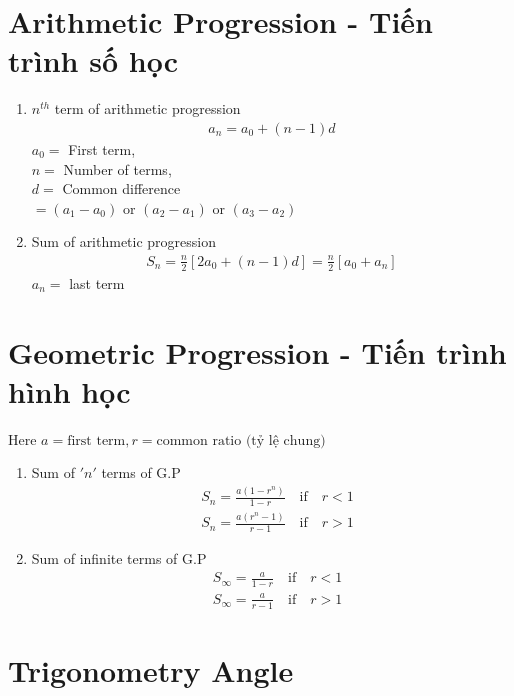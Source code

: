 \documentclass{article}
\begin{document}
\section{Arithmetic Progression - Tiến trình số học}
\begin{enumerate}[label=(\roman*)]
	
	\item $n^{th}$ term of arithmetic progression
	\begin{align*}
		a_n = a_0 + (n - 1)d
	\end{align*}
	$a_0 =$ First term, \\
	$n =$ Number of terms, \\
	$d =$ Common difference \\
	$ = (a_1 - a_0)$ or $(a_2 - a_1)$ or $(a_3 - a_2)$
	
	\item Sum of arithmetic progression
	\begin{align*}
		S_n = \frac{n}{2}[2a_0 + (n-1)d] = \frac{n}{2}[a_0 + a_n]
	\end{align*}
	$a_n =$ last term	
\end{enumerate}

\section{Geometric Progression - Tiến trình hình học}
Here $a = \text{first term}, r = \text{common ratio (tỷ lệ chung)}$
\begin{enumerate}[label=(\roman*)]
    \item Sum of $'n'$ terms of G.P
    \begin{align*}
        &S_n = \frac{a(1-r^n)}{1-r} \quad \text{if} \quad r < 1 \\
        &S_n = \frac{a(r^n - 1)}{r-1} \quad \text{if} \quad r > 1
    \end{align*}
    \item Sum of infinite terms of G.P
    \begin{align*}
        &S_{\infty} = \frac{a}{1-r} \quad \text{if} \quad r < 1 \\
        &S_{\infty} = \frac{a}{r-1} \quad \text{if} \quad r > 1
    \end{align*}
\end{enumerate}

\section{Trigonometry Angle}
\end{document}
